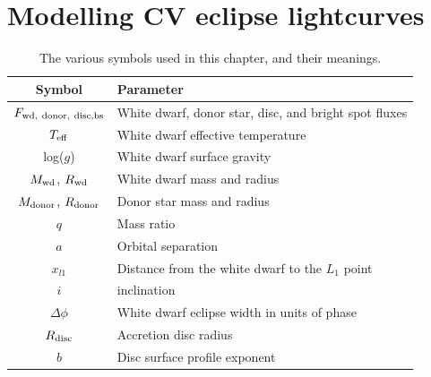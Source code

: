 \newpage
\section{Modelling CV eclipse lightcurves}
\label{sect:modelling:lightcurve modelling}

\begin{table}
    \centering
    \caption{The various symbols used in this chapter, and their meanings.}
    \label{table:modelling:parameter key}
    \begin{tabular}{cl}
        \hline
        Symbol & Parameter \\
        \hline
        \hline
        $F_{\rm wd,\ donor,\ disc, bs}$                                 & White dwarf, donor star, disc, and bright spot fluxes   \\
        $T_{\rm eff}$                                                   & White dwarf effective temperature \\
        log($g$)                                                        & White dwarf surface gravity \\
        $M_{\rm wd}$, $R_{\rm wd}$                                      & White dwarf mass and radius                             \\
        $M_{\rm donor}$, $R_{\rm donor}$                                & Donor star mass and radius                              \\
        $q$                                                             & Mass ratio                                              \\
        $a$                                                             & Orbital separation                                      \\
        $x_{l1}$                                                        & Distance from the white dwarf to the $L_1$ point        \\
        $i$                                                             & inclination                                             \\
        $\Delta \phi$                                                   & White dwarf eclipse width in units of phase             \\
        $R_{\rm disc}$                                                  & Accretion disc radius                                   \\
        $b$                                                             & Disc surface profile exponent                           \\

\end{tabular}
\end{table}
